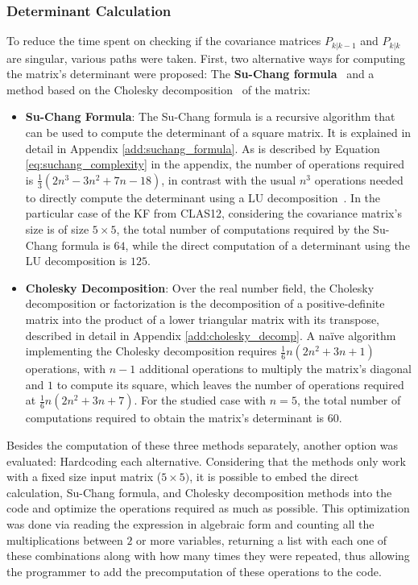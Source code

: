 \subsubsection{Determinant Calculation} \label{sssec:prop_det}

To reduce the time spent on checking if the covariance matrices $P_{k|k-1}$ and $P_{k|k}$ are singular, various paths were taken.
First, two alternative ways for computing the matrix's determinant were proposed: The \textbf{Su-Chang formula}~\cite{su1996quick} and a method based on the Cholesky decomposition~\cite{geijn2011notes} of the matrix:

    \begin{itemize}
        \item \textbf{Su-Chang Formula}: The Su-Chang formula is a recursive algorithm that can be used to compute the determinant of a square matrix.
        It is explained in detail in Appendix \ref{add:suchang_formula}.
        As is described by Equation \eqref{eq:suchang_complexity} in the appendix, the number of operations required is $\frac{1}{3}(2n^3 - 3n^2 + 7n - 18)$, in contrast with the usual $n^3$ operations needed to directly compute the determinant using a LU decomposition~\cite{banachiewicz1937berechnung}.
        In the particular case of the KF from CLAS12, considering the covariance matrix's size is of size $5\times5$, the total number of computations required by the Su-Chang formula is $64$, while the direct computation of a determinant using the LU decomposition is $125$.
        
        \item \textbf{Cholesky Decomposition}: Over the real number field, the Cholesky decomposition or factorization is the decomposition of a positive-definite matrix into the product of a lower triangular matrix with its transpose, described in detail in Appendix \ref{add:cholesky_decomp}.
        A na\"ive algorithm implementing the Cholesky decomposition requires $\frac{1}{6}n(2n^2 + 3n + 1)$ operations, with $n-1$ additional operations to multiply the matrix's diagonal and $1$ to compute its square, which leaves the number of operations required at $\frac{1}{6}n(2n^2 + 3n + 7)$.
        For the studied case with $n=5$, the total number of computations required to obtain the matrix's determinant is $60$.
    \end{itemize}

Besides the computation of these three methods separately, another option was evaluated: Hardcoding each alternative.
Considering that the methods only work with a fixed size input matrix ($5\times5)$, it is possible to embed the direct calculation, Su-Chang formula, and Cholesky decomposition methods into the code and optimize the operations required as much as possible.
This optimization was done via reading the expression in algebraic form and counting all the multiplications between $2$ or more variables, returning a list with each one of these combinations along with how many times they were repeated, thus allowing the programmer to add the precomputation of these operations to the code.

